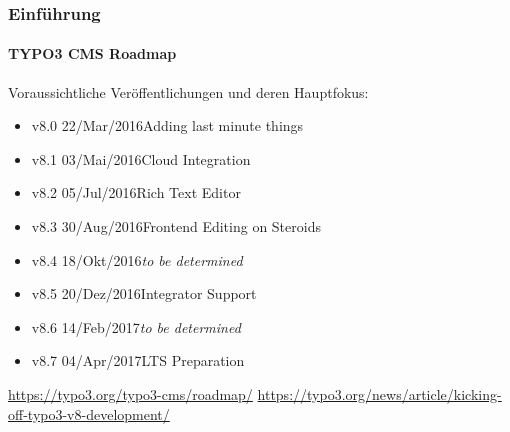 \begin{frame}[fragile]
	\frametitle{Einführung}
	\framesubtitle{TYPO3 CMS Roadmap}

	Voraussichtliche Veröffentlichungen und deren Hauptfokus:

	\begin{itemize}

		\item
			\begingroup
				\color{typo3orange}
					v8.0 \tabto{1.1cm}22/Mar/2016\tabto{3.4cm}Adding last minute things
			\endgroup
		\item v8.1 \tabto{1.1cm}03/Mai/2016\tabto{3.4cm}Cloud Integration
		\item v8.2 \tabto{1.1cm}05/Jul/2016\tabto{3.4cm}Rich Text Editor
		\item v8.3 \tabto{1.1cm}30/Aug/2016\tabto{3.4cm}Frontend Editing on Steroids
		\item v8.4 \tabto{1.1cm}18/Okt/2016\tabto{3.4cm}\textit{to be determined}
		\item v8.5 \tabto{1.1cm}20/Dez/2016\tabto{3.4cm}Integrator Support
		\item v8.6 \tabto{1.1cm}14/Feb/2017\tabto{3.4cm}\textit{to be determined}
		\item v8.7 \tabto{1.1cm}04/Apr/2017\tabto{3.4cm}LTS Preparation

	\end{itemize}

	\smaller
		\url{https://typo3.org/typo3-cms/roadmap/}\newline
		\url{https://typo3.org/news/article/kicking-off-typo3-v8-development/}
	\normalsize

\end{frame}


